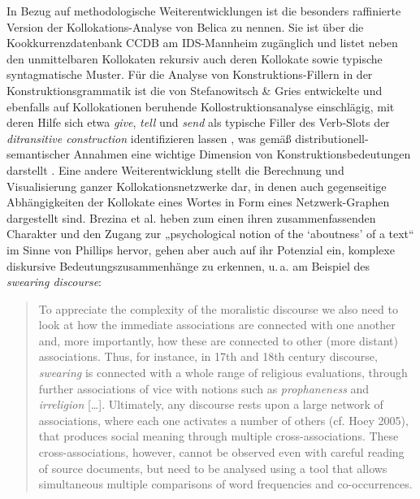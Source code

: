 In Bezug auf methodologische Weiterentwicklungen ist die besonders raffinierte Version der Kollokations-Analyse von Belica zu nennen. Sie ist über die Kookkurrenzdatenbank CCDB am IDS-Mannheim \autocite{belicaKookkurrenzdatenbankCCDBKorpuslinguistische2001} zugänglich und listet neben den unmittelbaren Kollokaten rekursiv auch deren Kollokate sowie typische syntagmatische Muster. Für die Analyse von Konstruktions-Fillern in der Konstruktionsgrammatik ist die von Stefanowitsch \& Gries \autocite*{stefanowitschCollostructionsInvestigatingInteraction2003} entwickelte und ebenfalls auf Kollokationen beruhende Kollostruktionsanalyse einschlägig, mit deren Hilfe sich etwa \emph{give}, \emph{tell} und \emph{send} als typische Filler des Verb-Slots der \emph{ditransitive construction} identifizieren lassen \autocite[229, Table 10]{stefanowitschCollostructionsInvestigatingInteraction2003}, was gemäß distributionell-semantischer Annahmen eine wichtige Dimension von Konstruktionsbedeutungen darstellt \autocite{ziemDimensionsConstructionalMeanings2023}. Eine andere Weiterentwicklung stellt die Berechnung und Visualisierung ganzer Kollokationsnetzwerke dar, in denen auch gegenseitige Abhängigkeiten der Kollokate eines Wortes in Form eines Netzwerk-Graphen dargestellt sind. Brezina et al. heben zum einen ihren zusammenfassenden Charakter und den Zugang zur „psychological notion of the `aboutness' of a text`` \autocite*[142]{brezinaCollocationsContextNew2015} im Sinne von Phillips \autocite*{phillipsLexicalStructureText1989} hervor, gehen aber auch auf ihr Potenzial ein, komplexe diskursive Bedeutungszusammenhänge zu erkennen, u.\,a. am Beispiel des \emph{swearing discourse}:

\begin{quote}
To appreciate the complexity of the moralistic discourse we also need to look at how the immediate associations are connected with one another and, more importantly, how these are connected to other (more distant) associations. Thus, for instance, in 17th and 18th century discourse, \emph{swearing} is connected with a whole range of religious evaluations, through further associations of vice with notions such as \emph{prophaneness} and \emph{irreligion} {[}\ldots{]}. Ultimately, any discourse rests upon a large network of associations, where each one activates a number of others (cf. Hoey 2005), that produces social meaning through multiple cross-associations. These cross-associations, however, cannot be observed even with careful reading of source documents, but need to be analysed using a tool that allows simultaneous multiple comparisons of word frequencies and co-occurrences. \autocite[155]{brezinaCollocationsContextNew2015}
\end{quote}

